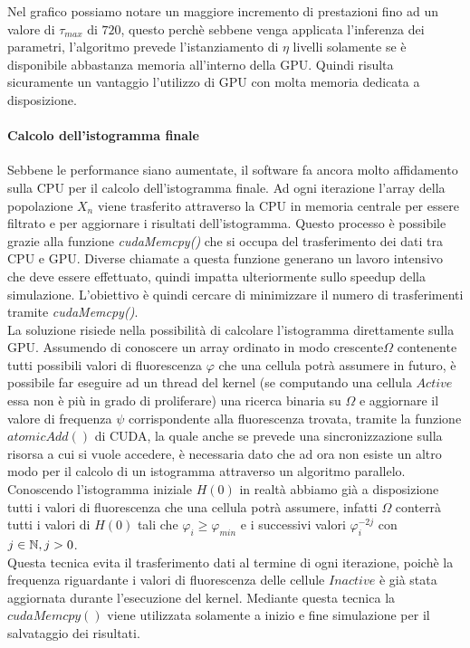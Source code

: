 Nel grafico possiamo notare un maggiore incremento di prestazioni fino
ad un valore di $\tau_{max}$ di $720$, questo perchè sebbene venga applicata
l'inferenza dei parametri, l'algoritmo prevede l'istanziamento di $\eta$
livelli solamente se è disponibile abbastanza memoria all'interno della GPU.
Quindi risulta sicuramente un vantaggio l'utilizzo di GPU con molta memoria
dedicata a disposizione.

\paragraph{Calcolo dell'istogramma finale}

Sebbene le performance siano aumentate, il software fa ancora molto affidamento
sulla CPU per il calcolo dell'istogramma finale.
Ad ogni iterazione l'array della popolazione $X_{n}$ viene trasferito
attraverso la CPU in memoria centrale per essere filtrato e per aggiornare i
risultati dell'istogramma. Questo processo è possibile grazie alla funzione
\textit{cudaMemcpy()} che si occupa del trasferimento dei dati tra CPU e GPU.
Diverse chiamate a questa funzione generano un lavoro intensivo che deve essere
effettuato, quindi impatta ulteriormente sullo speedup della simulazione.
L'obiettivo è quindi cercare di minimizzare il numero di trasferimenti tramite
\textit{cudaMemcpy()}.
\\
La soluzione risiede nella possibilità di calcolare l'istogramma direttamente
sulla GPU. Assumendo di conoscere un array ordinato in modo crescente$\Omega$
contenente tutti possibili valori di fluorescenza
$\varphi$ che una cellula potrà assumere in futuro, è possibile far eseguire
ad un thread del kernel (se computando una cellula $Active$ essa non è più in
grado di proliferare) una ricerca binaria su $\Omega$ e aggiornare
il valore di frequenza $\psi$ corrispondente alla fluorescenza trovata, tramite
la funzione $atomicAdd()$ di CUDA, la quale anche se prevede una
sincronizzazione sulla risorsa a cui si vuole accedere, è necessaria dato che
ad ora non esiste un altro modo per il calcolo di un istogramma attraverso un
algoritmo parallelo.
\\
Conoscendo l'istogramma iniziale $H(0)$ in realtà abbiamo già a disposizione
tutti i valori di fluorescenza che una cellula potrà assumere, infatti
$\Omega$ conterrà tutti i valori di $H(0)$ tali che $\varphi_{i} \geqslant
\varphi_{min}$ e i successivi valori $\varphi_{i}^{-2j}$ con $j \in \mathbb{N}, j > 0$.
\\
Questa tecnica evita il trasferimento dati al termine di ogni iterazione, poichè
la frequenza riguardante i valori di fluorescenza delle cellule $Inactive$
è già stata aggiornata durante l'esecuzione del kernel.
Mediante questa tecnica la $cudaMemcpy()$ viene utilizzata solamente a inizio
e fine simulazione per il salvataggio dei risultati.

